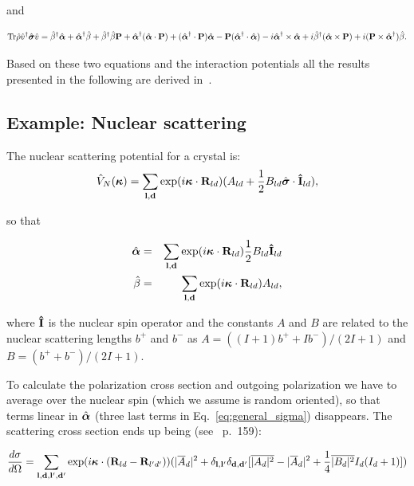 and 

\begin{equation}
  \label{eq:general_pol}
  \text{Tr} \hat{\rho} \hat{v}^\dagger \hat{\mbox{\boldmath $\sigma$}} \hat{v} =
  \hat{\beta}^\dagger \hat{\mbox{\boldmath $\alpha$}}
  + \hat{\mbox{\boldmath $\alpha$}}^\dagger \hat{\beta}
  + \hat{\beta}^\dagger \hat{\beta} \mathbf{P} 
  + \hat{\mbox{\boldmath $\alpha$}}^\dagger (\hat{\mbox{\boldmath $\alpha$}} \cdot \mathbf{P}) 
  + (\hat{\mbox{\boldmath $\alpha$}}^\dagger \cdot \mathbf{P}) \hat{\mbox{\boldmath $\alpha$}} 
  - \mathbf{P} (\hat{\mbox{\boldmath $\alpha$}}^\dagger \cdot \hat{\mbox{\boldmath $\alpha$}})
  - i \hat{\mbox{\boldmath $\alpha$}}^\dagger \times \hat{\mbox{\boldmath $\alpha$}}
  + i \hat{\beta}^\dagger (\hat{\mbox{\boldmath $\alpha$}} \times \mathbf{P})
  + i (\mathbf{P} \times \hat{\mbox{\boldmath $\alpha$}}^\dagger) \hat{\beta}.
\end{equation}

Based on these two equations and the interaction potentials all the
results presented in the following are derived in~\cite{lovesey}.

\subsection{Example: Nuclear scattering}

The nuclear scattering potential for a crystal is:
\begin{equation}
  \label{eq:nuclear_pot}
  \hat{V}_N(\mathbf{\mbox{\boldmath $\kappa$}}) = \sum_{\mathbf{l},\mathbf{d}} \exp(i\mathbf{\mbox{\boldmath $\kappa$}} \cdot \mathbf{R}_{ld})(A_{ld} + 
  \frac{1}{2} B_{ld} \hat{\mbox{\boldmath $\sigma$}} \cdot \mathbf{\hat{I}}_{ld}),
\end{equation}

so that 

\begin{eqnarray}
  \label{eq:ab_nuclear}
  \hat{\mbox{\boldmath $\alpha$}} & = & 
  \sum_{\mathbf{l},\mathbf{d}} \exp(i\mathbf{\mbox{\boldmath $\kappa$}} \cdot \mathbf{R}_{ld}) \frac{1}{2} B_{ld} \mathbf{\hat{I}}_{ld} \\
  \hat{\beta} & = &
  \sum_{\mathbf{l},\mathbf{d}} \exp(i\mathbf{\mbox{\boldmath $\kappa$}} \cdot \mathbf{R}_{ld}) A_{ld},
\end{eqnarray}

where $\mathbf{\hat{I}}$ is the nuclear spin operator and the constants $A$ and $B$
are related to the nuclear scattering lengths $b^+$ and $b^-$ as
$A=((I+1)b^++Ib^-)/(2I+1)$ and $B=(b^++b^-)/(2I+1)$.

To calculate the polarization cross section and outgoing polarization
we have to average over the nuclear spin (which we assume is random
oriented), so that terms linear in $\hat{\mbox{\boldmath $\alpha$}}$ (three last terms in
Eq.~\ref{eq:general_sigma}) disappears. The scattering cross section
ends up being (see~\cite{lovesey} p.~159):

\begin{equation}
  \label{eq:nuclear_sigma}
  \frac{d\sigma}{d\Omega}  = 
  \sum_{\mathbf{l}, \mathbf{d}, \mathbf{l}', \mathbf{d}'} \exp(i \mathbf{\mbox{\boldmath $\kappa$}} \cdot (\mathbf{R}_{ld}-\mathbf{R}_{l'd'}))
  (|\overline{A}_d|^2 + \delta_{\mathbf{l},\mathbf{l}'}\delta_{\mathbf{d},\mathbf{d}'}[\overline{|A_d|^2} - |\overline{A}_d|^2 
  + \frac{1}{4}\overline{|B_d|^2}I_d(I_d+1)])
\end{equation}

